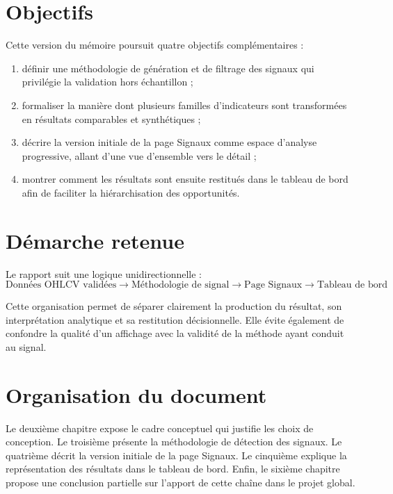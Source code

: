 \section{Objectifs}
Cette version du mémoire poursuit quatre objectifs complémentaires :
\begin{enumerate}
\item définir une méthodologie de génération et de filtrage des signaux qui
privilégie la validation hors échantillon ;
\item formaliser la manière dont plusieurs familles d'indicateurs sont
transformées en résultats comparables et synthétiques ;
\item décrire la version initiale de la page Signaux comme espace d'analyse
progressive, allant d'une vue d'ensemble vers le détail ;
\item montrer comment les résultats sont ensuite restitués dans le tableau de
bord afin de faciliter la hiérarchisation des opportunités.
\end{enumerate}

\section{Démarche retenue}
Le rapport suit une logique unidirectionnelle :
\[
\text{Données OHLCV validées} \rightarrow \text{Méthodologie de signal}
\rightarrow \text{Page Signaux} \rightarrow \text{Tableau de bord}
\]

Cette organisation permet de séparer clairement la production du résultat, son
interprétation analytique et sa restitution décisionnelle. Elle évite
également de confondre la qualité d'un affichage avec la validité de la méthode
ayant conduit au signal.

\section{Organisation du document}
Le deuxième chapitre expose le cadre conceptuel qui justifie les choix de
conception. Le troisième présente la méthodologie de détection des signaux. Le
quatrième décrit la version initiale de la page Signaux. Le cinquième explique
la représentation des résultats dans le tableau de bord. Enfin, le sixième
chapitre propose une conclusion partielle sur l'apport de cette chaîne dans le
projet global.

